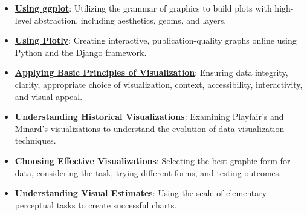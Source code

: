 \documentclass{article}%
\begin{document}
\begin{itemize}[leftmargin=*]
\item \href{https://purdue.brightspace.com/d2l/common/assets/pdfjs-d2l-dist/1.0.14-legacy/web/viewer.html?file=\%2Fcontent\%2Fenforced\%2F1095465-WL.202510.CS24200.LE1\%2F10L2-Vis.pdf\%3Fou\%3D1095465\&lang=en-us\&container=d2l-fileviewer-rendered-pdf\&fullscreen=d2l-fileviewer-rendered-pdf-dialog\&height=667#page=43}{\textbf{Using ggplot}}: Utilizing the grammar of graphics to build plots with high-level abstraction, including aesthetics, geoms, and layers.%
\item \href{https://purdue.brightspace.com/d2l/common/assets/pdfjs-d2l-dist/1.0.14-legacy/web/viewer.html?file=\%2Fcontent\%2Fenforced\%2F1095465-WL.202510.CS24200.LE1\%2F10L2-Vis.pdf\%3Fou\%3D1095465\&lang=en-us\&container=d2l-fileviewer-rendered-pdf\&fullscreen=d2l-fileviewer-rendered-pdf-dialog\&height=667#page=49}{\textbf{Using Plotly}}: Creating interactive, publication-quality graphs online using Python and the Django framework.%
\item \href{https://purdue.brightspace.com/d2l/common/assets/pdfjs-d2l-dist/1.0.14-legacy/web/viewer.html?file=\%2Fcontent\%2Fenforced\%2F1095465-WL.202510.CS24200.LE1\%2F10L2-Vis.pdf\%3Fou\%3D1095465\&lang=en-us\&container=d2l-fileviewer-rendered-pdf\&fullscreen=d2l-fileviewer-rendered-pdf-dialog\&height=667#page=56}{\textbf{Applying Basic Principles of Visualization}}: Ensuring data integrity, clarity, appropriate choice of visualization, context, accessibility, interactivity, and visual appeal.%
\item \href{https://purdue.brightspace.com/d2l/common/assets/pdfjs-d2l-dist/1.0.14-legacy/web/viewer.html?file=\%2Fcontent\%2Fenforced\%2F1095465-WL.202510.CS24200.LE1\%2F10L2-Vis.pdf\%3Fou\%3D1095465\&lang=en-us\&container=d2l-fileviewer-rendered-pdf\&fullscreen=d2l-fileviewer-rendered-pdf-dialog\&height=667#page=57}{\textbf{Understanding Historical Visualizations}}: Examining Playfair's and Minard's visualizations to understand the evolution of data visualization techniques.%
\item \href{https://purdue.brightspace.com/d2l/common/assets/pdfjs-d2l-dist/1.0.14-legacy/web/viewer.html?file=\%2Fcontent\%2Fenforced\%2F1095465-WL.202510.CS24200.LE1\%2F10L2-Vis.pdf\%3Fou\%3D1095465\&lang=en-us\&container=d2l-fileviewer-rendered-pdf\&fullscreen=d2l-fileviewer-rendered-pdf-dialog\&height=667#page=59}{\textbf{Choosing Effective Visualizations}}: Selecting the best graphic form for data, considering the task, trying different forms, and testing outcomes.%
\item \href{https://purdue.brightspace.com/d2l/common/assets/pdfjs-d2l-dist/1.0.14-legacy/web/viewer.html?file=\%2Fcontent\%2Fenforced\%2F1095465-WL.202510.CS24200.LE1\%2F10L2-Vis.pdf\%3Fou\%3D1095465\&lang=en-us\&container=d2l-fileviewer-rendered-pdf\&fullscreen=d2l-fileviewer-rendered-pdf-dialog\&height=667#page=62}{\textbf{Understanding Visual Estimates}}: Using the scale of elementary perceptual tasks to create successful charts.%

\end{itemize}
\end{document}
